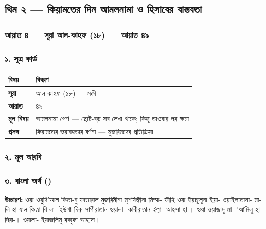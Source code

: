 \subsection*{থিম ২ — কিয়ামতের দিন আমলনামা ও হিসাবের বাস্তবতা}

\subsubsection*{আয়াত ৪ — সূরা আল-কাহফ (১৮) — আয়াত ৪৯}

\subsubsection*{১. সূত্র কার্ড}

\begin{table}[h]\centering\small
\begin{tabular}{ll}
বিষয় & বিবরণ \\
\hline
\textbf{সূরা} & আল-কাহফ (১৮) — মক্কী \\
\textbf{আয়াত} & ৪৯ \\
\textbf{মূল বিষয়} & আমলনামা পেশ — ছোট-বড় সব লেখা থাকে; কিন্তু তাওবার পর ক্ষমা \\
\textbf{প্রসঙ্গ} & কিয়ামতের ভয়াবহতার বর্ণনা — মুজরিমদের প্রতিক্রিয়া \\
\hline
\end{tabular}
\end{table}

\subsubsection*{২. মূল আরবি}

\begin{center}\end{center}

\subsubsection*{৩. বাংলা অর্থ ()}

\textbf{উচ্চারণ:} ওয়া ওয়ুদি'আল কিতা-বু ফাতারাল মুজরিমীনা মুশফিক্বীনা মিম্মা- ফীহি ওয়া ইয়াক্বুলূনা ইয়া- ওয়াইলাতানা- মা- লি হা-যাল কিতা-বি লা- ইউগা-দিরু সাগীরাতান ওয়ালা- কাবীরাতান ইল্লা- আহসা-হা-। ওয়া ওয়াজাদূ মা- 'আমিলূ হা-দিরা-। ওয়ালা- ইয়াজলিমু রব্বুকা আহাদা।

